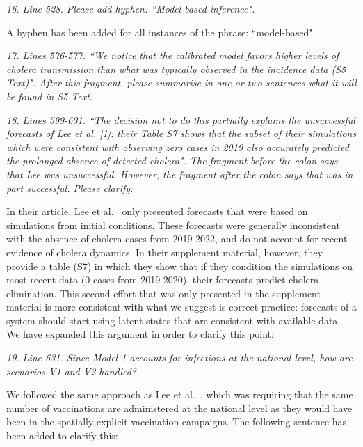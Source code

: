 \documentclass[11pt]{article}
\newcommand\report[1]{{\color{mygreen} \vspace{1mm}\hspace{0.25in}\parbox{6in}{\em #1}}}
\newcommand\article[1]{{\color{blue} \vspace{1mm}\hspace{0.25in}\parbox{6in}{\em #1}}}
\begin{document}
\report{
  16. Line 528. Please add hyphen: ``Model-based inference".
}

A hyphen has been added for all instances of the phrase: ``model-based".

\report{
  17. Lines 576-577. ``We notice that the calibrated model favors higher levels of cholera transmission than what was typically observed in the incidence data (S5 Text)". After this fragment, please summarise in one or two sentences what it will be found in S5 Text.
}

\report{
  18. Lines 599-601. ``The decision not to do this partially explains the unsuccessful forecasts of Lee et al. [1]: their Table S7 shows that the subset of their simulations which were consistent with observing zero cases in 2019 also accurately predicted the prolonged absence of detected cholera". The fragment before the colon says that Lee was unsuccessful. However, the fragment after the colon says that was in part successful. Please clarify.
}

In their article, Lee et al.~\cite{lee20} only presented forecasts that were based on simulations from initial conditions. These forecasts were generally inconsistent with the absence of cholera cases from 2019-2022, and do not account for recent evidence of cholera dynamics. In their supplement material, however, they provide a table (S7) in which they show that if they condition the simulations on most recent data (0 cases from 2019-2020), their forecasts predict cholera elimination. This second effort that was only presented in the supplement material is more consistent with what we suggest is correct practice: forecasts of a system should start using latent states that are consistent with available data. We have expanded this argument in order to clarify this point: 

\article{\editForecastOne}

\article{\editForecastTwo}

\report{
  19. Line 631. Since Model 1 accounts for infections at the national level, how are scenarios V1 and V2 handled?
}

We followed the same approach as Lee et al.~\cite{lee20}, which was requiring that the same number of vaccinations are administered at the national level as they would have been in the spatially-explicit vaccination campaigns. 
The following sentence has been added to clarify this: 

\article{\editModVacc}


\end{document}
